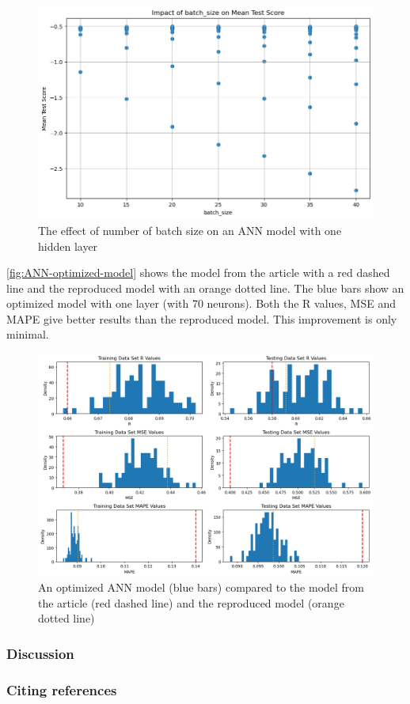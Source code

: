 \documentclass{article}
\begin{document}
\begin{figure}
	\centering
	\includegraphics[width=\linewidth]{figures/ANN_impact_batchsize_1layer.png}
	\caption{The effect of number of batch size on an ANN model with one hidden layer}
	\label{fig:ANN-impact-batchsize-1layer}
\end{figure}

\autoref{fig:ANN-optimized-model} shows the model from the article with a red dashed line and the reproduced model with an orange dotted line. The blue bars show an optimized model with one layer (with 70 neurons). Both the R values, MSE and MAPE give better results than the reproduced model. This improvement is only minimal.


\begin{figure}
	\centering
	\includegraphics[width=\linewidth]{figures/ANN_optimized_model.png}
	\caption{An optimized ANN model (blue bars) compared to the model from the article (red dashed line) and the reproduced model (orange dotted line)}
	\label{fig:ANN-optimized-model}
\end{figure}




\subsubsection{Discussion}



\subsubsection{Citing references}




\end{document}

